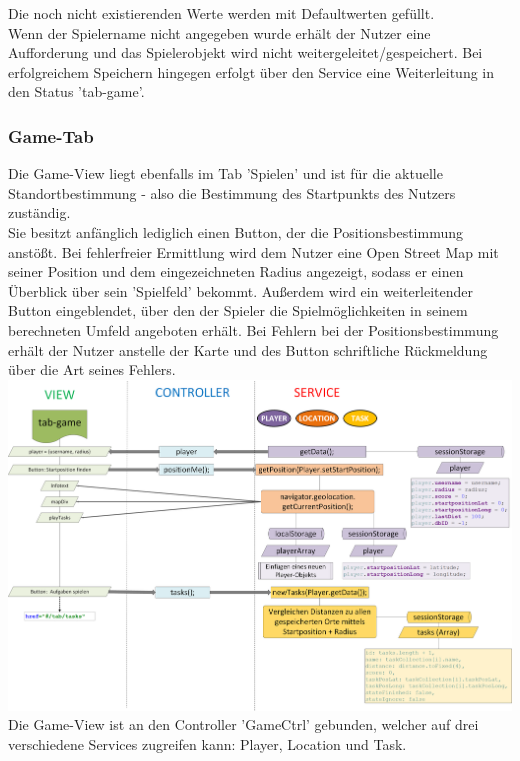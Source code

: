 Die noch nicht existierenden Werte werden mit Defaultwerten gefüllt.
\\
Wenn der Spielername nicht angegeben wurde erhält der Nutzer eine Aufforderung und das Spielerobjekt wird nicht weitergeleitet/gespeichert. Bei erfolgreichem Speichern hingegen erfolgt über den Service eine Weiterleitung in den Status 'tab-game'.

\subsubsection{Game-Tab}
%
%
Die Game-View liegt ebenfalls im Tab 'Spielen' und ist für die aktuelle Standortbestimmung - also die Bestimmung des Startpunkts des Nutzers zuständig.
\\
Sie besitzt anfänglich lediglich einen Button, der die Positionsbestimmung anstößt. Bei fehlerfreier Ermittlung wird dem Nutzer eine Open Street Map mit seiner Position und dem eingezeichneten Radius angezeigt, sodass er einen Überblick über sein 'Spielfeld' bekommt. Außerdem wird ein weiterleitender Button eingeblendet, über den der Spieler die Spielmöglichkeiten in seinem berechneten Umfeld angeboten erhält.
Bei Fehlern bei der Positionsbestimmung erhält der Nutzer anstelle der Karte und des Button schriftliche Rückmeldung über die Art seines Fehlers.
%
%
\\ \includegraphics[width=1\textwidth]{ref/images/03-game-tab.png} \\
%
%
Die Game-View ist an den Controller 'GameCtrl' gebunden, welcher auf drei verschiedene Services zugreifen kann: Player, Location und Task.
\\
